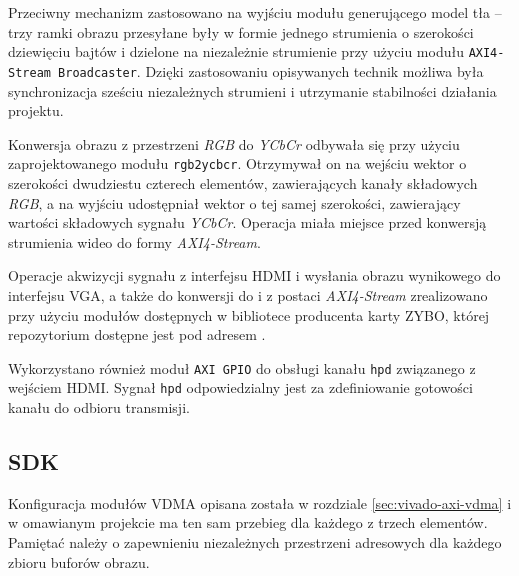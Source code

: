 Przeciwny mechanizm zastosowano na wyjściu modułu generującego model tła -- trzy ramki obrazu przesyłane były w formie jednego strumienia o szerokości dziewięciu bajtów i dzielone na niezależnie strumienie przy użyciu modułu \texttt{AXI4-Stream Broadcaster}. Dzięki zastosowaniu opisywanych technik możliwa była synchronizacja sześciu niezależnych strumieni i utrzymanie stabilności działania projektu.

Konwersja obrazu z przestrzeni \emph{RGB} do \emph{YCbCr} odbywała się przy użyciu zaprojektowanego modułu \texttt{rgb2ycbcr}. Otrzymywał on na wejściu wektor o szerokości dwudziestu czterech elementów, zawierających kanały składowych \emph{RGB}, a na wyjściu udostępniał wektor o tej samej szerokości, zawierający wartości składowych sygnału \emph{YCbCr}. Operacja miała miejsce przed konwersją strumienia wideo do formy \emph{AXI4-Stream}.

Operacje akwizycji sygnału z interfejsu HDMI i wysłania obrazu wynikowego do interfejsu VGA, a także do konwersji do i z postaci \emph{AXI4-Stream} zrealizowano przy użyciu modułów dostępnych w bibliotece producenta karty ZYBO, której repozytorium dostępne jest pod adresem \cite{vivado-library}.

Wykorzystano również moduł \texttt{AXI GPIO} do obsługi kanału \texttt{hpd} związanego z wejściem HDMI. Sygnał \texttt{hpd} odpowiedzialny jest za zdefiniowanie gotowości kanału do odbioru transmisji.



\subsection{SDK}

Konfiguracja modułów VDMA opisana została w rozdziale \ref{sec:vivado-axi-vdma} i w omawianym projekcie ma ten sam przebieg dla każdego z trzech elementów. 
Pamiętać należy o zapewnieniu niezależnych przestrzeni adresowych dla każdego zbioru buforów obrazu.

